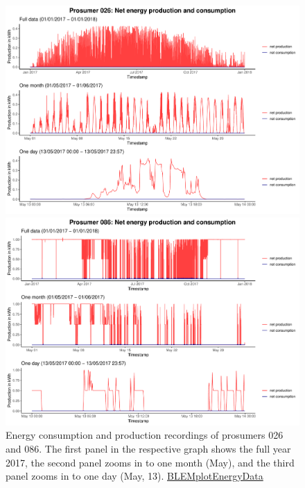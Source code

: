 \begin{figure}
\centering
\begin{minipage}[h]{\dimexpr.5\textwidth-0.15em}
\includegraphics[width=\textwidth]{thesis/graphs/timeseries/p026_prod&cons.pdf}
\end{minipage}
\begin{minipage}[h]{\dimexpr.5\textheight-0.15em}
\includegraphics[width=\textwidth]{thesis/graphs/timeseries/p086_prod&cons.pdf}
\end{minipage}

\caption[Energy consumption and production recordings of prosumers 026 and 086]{Energy consumption and production recordings of prosumers 026 and 086. The first panel in the respective graph shows the full year 2017, the second panel zooms in to one month (May), and the third panel zooms in to one day (May, 13). \quantnet\href{ }{BLEMplotEnergyData}}
\label{Fig:energyconsprod_p026p086}

\end{figure}

